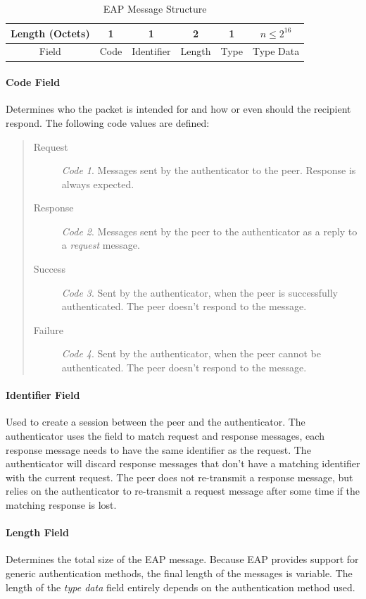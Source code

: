 \begin{table}
	\centering
	\begin{tabular}{|c|c|c|c|c|c|}
		\hline
		Length (Octets) & 1 & 1 & 2 & 1 & $n \le 2^{16}$\\
		\hline
		Field & Code & Identifier & Length & Type & Type Data\\
		\hline
	\end{tabular}
	\caption{EAP Message Structure}
	\label{table:eap-message}
\end{table}

\paragraph{Code Field}
Determines who the packet is intended for and how or even should the recipient respond.
The following code values are defined:

\begin{quote}
\begin{description}
	\item[Request]\textit{Code 1}. Messages sent by the authenticator to the peer. Response is always expected.
	\item[Response]\textit{Code 2}. Messages sent by the peer to the authenticator as a reply to a \textit{request} message.
	\item[Success]\textit{Code 3}. Sent by the authenticator, when the peer is successfully authenticated. The peer doesn't respond to the message.
	\item[Failure]\textit{Code 4}. Sent by the authenticator, when the peer cannot be authenticated. The peer doesn't respond to the message.
\end{description}
\end{quote}

\paragraph{Identifier Field}
Used to create a session between the peer and the authenticator.
The authenticator uses the field to match request and response messages, each response message needs to have the same identifier as the request.
The authenticator will discard response messages that don't have a matching identifier with the current request.
The peer does not re-transmit a response message, but relies on the authenticator to re-transmit a request message after some time if the matching response is lost.

\paragraph{Length Field}
Determines the total size of the EAP message. Because EAP provides support for generic authentication methods, the final length of the messages is variable.
The length of the \textit{type data} field entirely depends on the authentication method used.

